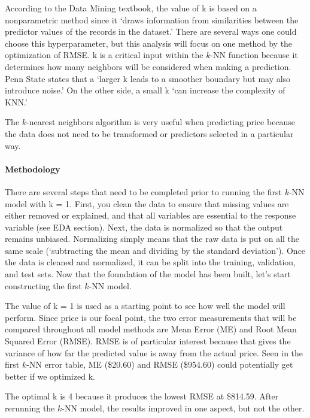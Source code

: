 \documentclass[
  paper=a4,
  ,captions=tableheading
]{scrartcl}
\begin{document}
According to the Data Mining textbook, the value of k is based on a
nonparametric method since it `draws information from similarities
between the predictor values of the records in the dataset.' There are
several ways one could choose this hyperparameter, but this analysis
will focus on one method by the optimization of RMSE. k is a critical
input within the \(k\)-NN function because it determines how many
neighbors will be considered when making a prediction. Penn State states
that a `larger k leads to a smoother boundary but may also introduce
noise.' On the other side, a small k `can increase the complexity of
KNN.'

The \(k\)-nearest neighbors algorithm is very useful when predicting
price because the data does not need to be transformed or predictors
selected in a particular way.

\hypertarget{methodology}{%
\paragraph{Methodology}\label{methodology}}

There are several steps that need to be completed prior to running the
first \(k\)-NN model with k = 1. First, you clean the data to ensure
that missing values are either removed or explained, and that all
variables are essential to the response variable (see EDA section).
Next, the data is normalized so that the output remains unbiased.
Normalizing simply means that the raw data is put on all the same scale
(`subtracting the mean and dividing by the standard deviation'). Once
the data is cleaned and normalized, it can be split into the training,
validation, and test sets. Now that the foundation of the model has been
built, let's start constructing the first \(k\)-NN model.

The value of k = 1 is used as a starting point to see how well the model
will perform. Since price is our focal point, the two error measurements
that will be compared throughout all model methods are Mean Error (ME)
and Root Mean Squared Error (RMSE). RMSE is of particular interest
because that gives the variance of how far the predicted value is away
from the actual price. Seen in the first \(k\)-NN error table, ME
(\$20.60) and RMSE (\$954.60) could potentially get better if we
optimized k.

The optimal k is 4 because it produces the lowest RMSE at \$814.59.
After rerunning the \(k\)-NN model, the results improved in one aspect,
but not the other.
\end{document}
